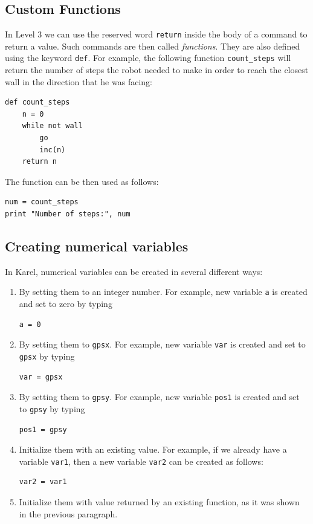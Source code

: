 \subsection{Custom Functions}

In Level 3 we can use the reserved word {\tt return} inside the body of
a command to return a value. Such commands are then called {\em functions}. 
They are also defined using the keyword {\tt def}. For example, the following function
{\tt count\_steps} will return the number of steps the robot needed to 
make in order to reach the closest wall in the direction that he was facing:

\begin{verbatim}
def count_steps
    n = 0
    while not wall
        go
        inc(n)
    return n
\end{verbatim}
The function can be then used as follows:

\begin{verbatim}
num = count_steps
print "Number of steps:", num 
\end{verbatim}

\subsection{Creating numerical variables} \label{par:var}

In Karel, numerical variables can be created in several different ways: 
\begin{enumerate}
\item By setting them to an integer number. For example, new variable {\tt a} is created and set to zero by typing 
\begin{verbatim}
a = 0
\end{verbatim}
\item By setting them to {\tt gpsx}. For example, new variable {\tt var} is created and set to {\tt gpsx} by typing
\begin{verbatim}
var = gpsx
\end{verbatim}
\item By setting them to {\tt gpsy}. For example, new variable {\tt pos1} is created and set to {\tt gpsy} by typing
\begin{verbatim}
pos1 = gpsy
\end{verbatim}
\item Initialize them with an existing value. For example, if we already have a variable {\tt var1}, then a new variable 
{\tt var2} can be created as follows:
\begin{verbatim}
var2 = var1
\end{verbatim}
\item Initialize them with value returned by an existing function, as it was shown in the previous 
paragraph. 
\end{enumerate}

